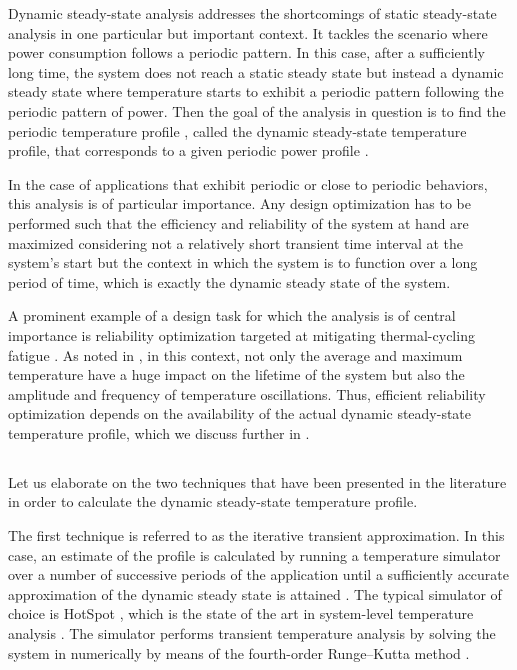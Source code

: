 Dynamic steady-state analysis addresses the shortcomings of static steady-state
analysis in one particular but important context. It tackles the scenario where
power consumption follows a periodic pattern. In this case, after a sufficiently
long time, the system does not reach a static steady state but instead a dynamic
steady state where temperature starts to exhibit a periodic pattern following
the periodic pattern of power. Then the goal of the analysis in question is to
find the periodic temperature profile \mq, called the dynamic steady-state
temperature profile, that corresponds to a given periodic power profile \mp.

In the case of applications that exhibit periodic or close to periodic
behaviors, this analysis is of particular importance. Any design optimization
has to be performed such that the efficiency and reliability of the system at
hand are maximized considering not a relatively short transient time interval at
the system's start but the context in which the system is to function over a
long period of time, which is exactly the dynamic steady state of the system.

A prominent example of a design task for which the analysis is of central
importance is reliability optimization targeted at mitigating thermal-cycling
fatigue \cite{jedec2016}. As noted in , in this
context, not only the average and maximum temperature have a huge impact on the
lifetime of the system but also the amplitude and frequency of temperature
oscillations. Thus, efficient reliability optimization depends on the
availability of the actual dynamic steady-state temperature profile, which we
discuss further in .

\subsection{\priortitle}

Let us elaborate on the two techniques that have been presented in the
literature in order to calculate the dynamic steady-state temperature profile.

The first technique is referred to as the iterative transient approximation. In
this case, an estimate of the profile is calculated by running a temperature
simulator over a number of successive periods of the application until a
sufficiently accurate approximation of the dynamic steady state is attained
\cite{srinivasan2004}. The typical simulator of choice is HotSpot
\cite{skadron2003}, which is the state of the art in system-level temperature
analysis \cite{srinivasan2004, liao2005, coskun2006, liu2007, huang2009b,
xiang2010, thiele2011}. The simulator performs transient temperature analysis by
solving the system in  numerically by means of
the fourth-order Runge--Kutta method \cite{press2007}.

